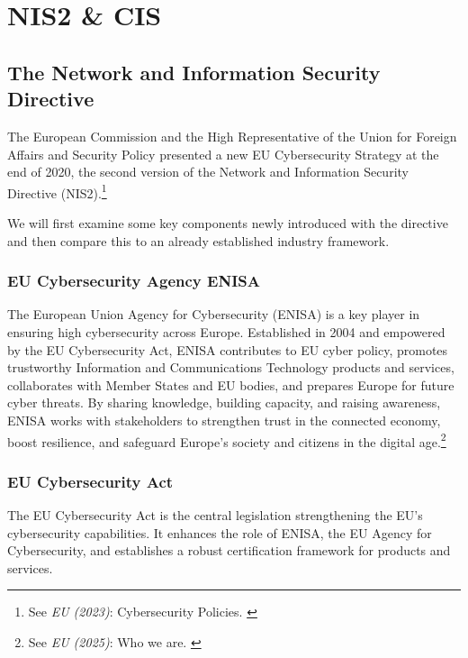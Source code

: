 %
%

\pagebreak
\section{NIS2 \& CIS}

\onehalfspacing

\subsection{The Network and Information Security Directive}

The European Commission and the High Representative of the Union for Foreign Affairs and Security Policy presented a new EU Cybersecurity Strategy at the end of 2020, the second version of the Network and Information Security Directive (NIS2).\footnote{See \textit{EU (2023)}: Cybersecurity Policies. \cite{cyberPol}}

We will first examine some key components newly introduced with the directive and then compare this to an already established industry framework.

\subsubsection{EU Cybersecurity Agency ENISA}

The European Union Agency for Cybersecurity (ENISA) is a key player in ensuring high cybersecurity across Europe. Established in 2004 and empowered by the EU Cybersecurity Act, ENISA contributes to EU cyber policy, promotes trustworthy Information and Communications Technology products and services, collaborates with Member States and EU bodies, and prepares Europe for future cyber threats. By sharing knowledge, building capacity, and raising awareness, ENISA works with stakeholders to strengthen trust in the connected economy, boost resilience, and safeguard Europe's society and citizens in the digital age.\footnote{See \textit{EU (2025)}: Who we are. \cite{aboutEnisa}}

\subsubsection{EU Cybersecurity Act}

The EU Cybersecurity Act is the central legislation strengthening the EU's cybersecurity capabilities. It enhances the role of ENISA, the EU Agency for Cybersecurity, and establishes a robust certification framework for products and services.

